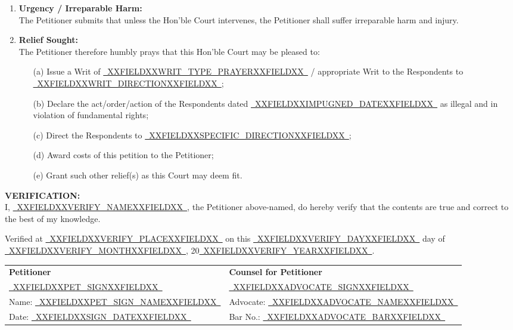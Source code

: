 \documentclass[12pt,a4paper]{article}
\newcommand{\fillline}[1]{\underline{~#1~}}
\begin{document}
\begin{enumerate}
    \vspace{0.5em}
    \item \textbf{Urgency / Irreparable Harm:}\\
    The Petitioner submits that unless the Hon'ble Court intervenes, the Petitioner
    shall suffer irreparable harm and injury.

    \vspace{0.5em}
    \item \textbf{Relief Sought:}\\
    The Petitioner therefore humbly prays that this Hon'ble Court may be pleased to:
    \begin{enumerate}
        \item[(a)] Issue a Writ of \fillline{XXFIELDXXWRIT_TYPE_PRAYERXXFIELDXX} / appropriate Writ to the
                   Respondents to \fillline{XXFIELDXXWRIT_DIRECTIONXXFIELDXX};
        \item[(b)] Declare the act/order/action of the Respondents dated
                   \fillline{XXFIELDXXIMPUGNED_DATEXXFIELDXX} as illegal and in violation of fundamental rights;
        \item[(c)] Direct the Respondents to \fillline{XXFIELDXXSPECIFIC_DIRECTIONXXFIELDXX};
        \item[(d)] Award costs of this petition to the Petitioner;
        \item[(e)] Grant such other relief(s) as this Court may deem fit.
    \end{enumerate}
\end{enumerate}

\vspace{2em}

\noindent\textbf{VERIFICATION:}\\
I, \fillline{XXFIELDXXVERIFY_NAMEXXFIELDXX}, the Petitioner above-named, do hereby verify that the
contents are true and correct to the best of my knowledge.

\vspace{1em}
\noindent Verified at \fillline{XXFIELDXXVERIFY_PLACEXXFIELDXX} on this \fillline{XXFIELDXXVERIFY_DAYXXFIELDXX} day of
\fillline{XXFIELDXXVERIFY_MONTHXXFIELDXX}, 20\fillline{XXFIELDXXVERIFY_YEARXXFIELDXX}.

\vspace{2em}

\noindent
\begin{tabularx}{\textwidth}{@{}X X@{}}
    \textbf{Petitioner} & \textbf{Counsel for Petitioner}\\
    \fillline{XXFIELDXXPET_SIGNXXFIELDXX} & \fillline{XXFIELDXXADVOCATE_SIGNXXFIELDXX}\\
    Name: \fillline{XXFIELDXXPET_SIGN_NAMEXXFIELDXX} & Advocate: \fillline{XXFIELDXXADVOCATE_NAMEXXFIELDXX}\\
    Date: \fillline{XXFIELDXXSIGN_DATEXXFIELDXX} & Bar No.: \fillline{XXFIELDXXADVOCATE_BARXXFIELDXX}\\
\end{tabularx}
\end{document}
